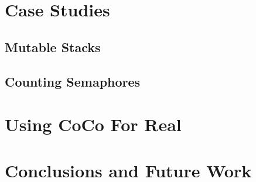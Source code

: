 \blindtext

\section{Case Studies}
\label{sec:coco-casestudies}

\blindtext

\subsection{Mutable Stacks}
\subsection{Counting Semaphores}

\section{Using CoCo For Real}
\label{sec:coco-evaluation}

\blindtext

\section{Conclusions and Future Work}
\label{sec:coco-conclusions}

\blindtext
